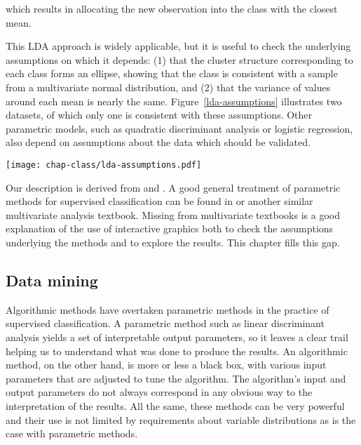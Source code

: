 \noindent which results in allocating the new observation into the
class with the closest mean.

This LDA approach is widely applicable, but it is useful
to check the underlying assumptions on which it depends: (1)
that the cluster structure corresponding to each class forms an
ellipse, showing that the class is consistent with a sample from a
multivariate normal distribution, and (2) that the variance of values
around each mean is nearly the same. Figure~\ref{lda-assumptions}
illustrates two datasets, of which only one is consistent with these
assumptions. Other parametric models, such as quadratic discriminant
analysis or logistic regression, also depend on assumptions
about the data which should be validated.   

\begin{figure*}[htbp]
\centerline{{\texttt{[image: chap-class/lda-assumptions.pdf]}}}


\caption[Evaluating model assumptions for 2D data]{Evaluating model
assumptions by comparing scatterplots of raw data with bivariate
normal variance--covariance ellipses.  For the  {\bf
(top row)}, each of the three classes in the raw data {\bf (left)}
appears consistent with a sample from a bivariate normal distribution
with equal variance--covariance.  For the , the
clusters are not elliptical, and the variance differs from cluster to
cluster.}
\label{lda-assumptions}
\end{figure*}

Our description is derived from  and
. A good general treatment of parametric methods for
supervised classification can be found in  or another
similar multivariate analysis textbook. Missing from multivariate
textbooks is a good explanation of the use of interactive graphics
both to check the assumptions underlying the methods and to explore
the results. This chapter fills this gap.

\subsection{Data mining}

Algorithmic methods have overtaken parametric methods in the practice
of supervised classification.  A parametric method such as linear
discriminant analysis yields a set of interpretable output parameters, so
it leaves a clear trail helping us to understand what was done to
produce the results.  An algorithmic method, on the other hand, is
more or less a black box, with various input parameters that are
adjusted to tune the algorithm.  The algorithm's input and output
parameters do not always correspond in any obvious way to the
interpretation of the results.  All the same, these methods can be
very powerful and their use is not limited by requirements about
variable distributions as is the case with parametric methods.

